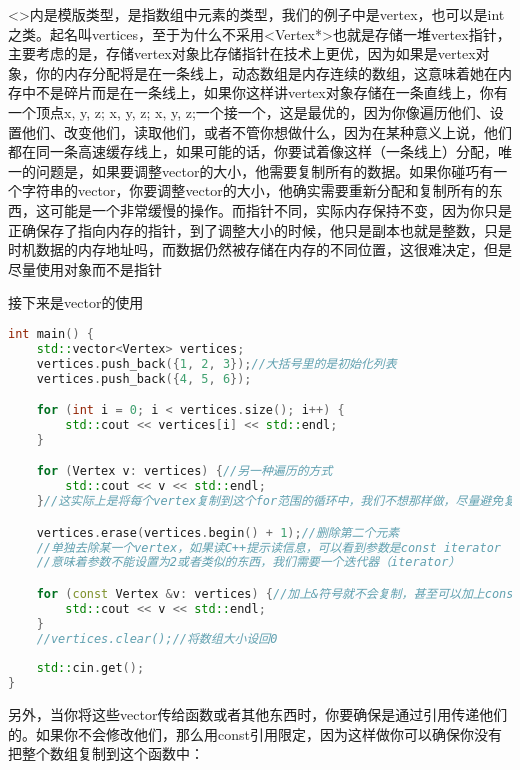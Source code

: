 {\ncodestyle <>}内是模版类型，是指数组中元素的类型，我们的例子中是{\ncodestyle vertex}，也可以是{\ncodestyle int}之类。起名叫{\ncodestyle vertices}，至于为什么不采用{\ncodestyle <Vertex*>}也就是存储一堆{\ncodestyle vertex}指针，主要考虑的是，存储{\ncodestyle vertex}对象比存储指针在技术上更优，因为如果是{\ncodestyle vertex}对象，你的内存分配将是在一条线上，动态数组是内存连续的数组，这意味着她在内存中不是碎片而是在一条线上，如果你这样讲{\ncodestyle vertex}对象存储在一条直线上，你有一个顶点{\ncodestyle x, y, z; x, y, z; x, y, z;}一个接一个，这是最优的，因为你像遍历他们、设置他们、改变他们，读取他们，或者不管你想做什么，因为在某种意义上说，他们都在同一条高速缓存线上，如果可能的话，你要试着像这样（一条线上）分配，唯一的问题是，如果要调整{\ncodestyle vector}的大小，他需要复制所有的数据。如果你碰巧有一个字符串的{\ncodestyle vector}，你要调整{\ncodestyle vector}的大小，他确实需要重新分配和复制所有的东西，这可能是一个非常缓慢的操作。而指针不同，实际内存保持不变，因为你只是正确保存了指向内存的指针，到了调整大小的时候，他只是副本也就是整数，只是时机数据的内存地址吗，而数据仍然被存储在内存的不同位置，这很难决定，但是尽量使用对象而不是指针

接下来是{\ncodestyle vector}的使用

\begin{lstlisting}[language=c++]
int main() {
    std::vector<Vertex> vertices;
    vertices.push_back({1, 2, 3});//大括号里的是初始化列表
    vertices.push_back({4, 5, 6});

    for (int i = 0; i < vertices.size(); i++) {
        std::cout << vertices[i] << std::endl;
    }

    for (Vertex v: vertices) {//另一种遍历的方式
        std::cout << v << std::endl;
    }//这实际上是将每个vertex复制到这个for范围的循环中，我们不想那样做，尽量避免复制

    vertices.erase(vertices.begin() + 1);//删除第二个元素
    //单独去除某一个vertex，如果读C++提示读信息，可以看到参数是const iterator
    //意味着参数不能设置为2或者类似的东西，我们需要一个迭代器（iterator）

    for (const Vertex &v: vertices) {//加上&符号就不会复制，甚至可以加上const
        std::cout << v << std::endl;
    }
    //vertices.clear();//将数组大小设回0
    
    std::cin.get();
}
\end{lstlisting}

另外，当你将这些{\ncodestyle vector}传给函数或者其他东西时，你要确保是通过引用传递他们的。如果你不会修改他们，那么用{\ncodestyle const}引用限定，因为这样做你可以确保你没有把整个数组复制到这个函数中：

